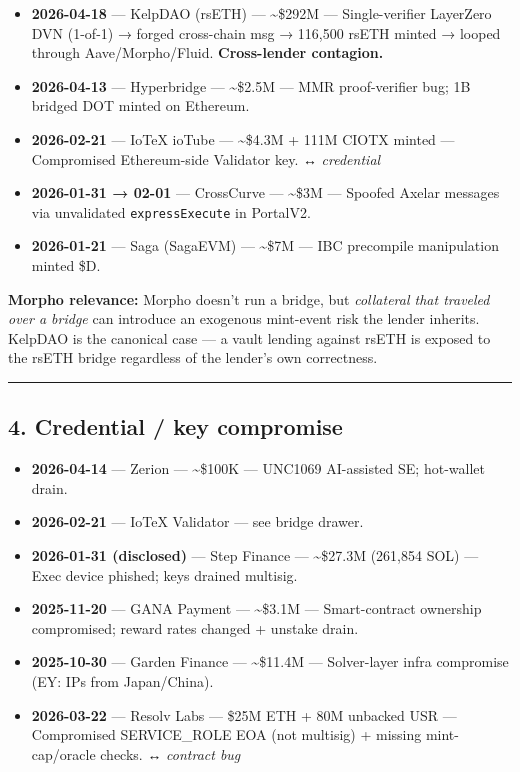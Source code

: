 \begin{itemize}
\tightlist
\item
  \textbf{2026-04-18} --- KelpDAO (rsETH) --- \textasciitilde\$292M --- Single-verifier LayerZero DVN (1-of-1) → forged cross-chain msg → 116,500 rsETH minted → looped through Aave/Morpho/Fluid. \textbf{Cross-lender contagion.}
\item
  \textbf{2026-04-13} --- Hyperbridge --- \textasciitilde\$2.5M --- MMR proof-verifier bug; 1B bridged DOT minted on Ethereum.
\item
  \textbf{2026-02-21} --- IoTeX ioTube --- \textasciitilde\$4.3M + 111M CIOTX minted --- Compromised Ethereum-side Validator key. ↔ \emph{credential}
\item
  \textbf{2026-01-31 → 02-01} --- CrossCurve --- \textasciitilde\$3M --- Spoofed Axelar messages via unvalidated \texttt{expressExecute} in PortalV2.
\item
  \textbf{2026-01-21} --- Saga (SagaEVM) --- \textasciitilde\$7M --- IBC precompile manipulation minted \$D.
\end{itemize}

\textbf{Morpho relevance:} Morpho doesn't run a bridge, but \emph{collateral that traveled over a bridge} can introduce an exogenous mint-event risk the lender inherits. KelpDAO is the canonical case --- a vault lending against rsETH is exposed to the rsETH bridge regardless of the lender's own correctness.

\begin{center}\rule{0.5\linewidth}{0.5pt}\end{center}

\subsection{4. Credential / key compromise}\label{credential-key-compromise}

\begin{itemize}
\tightlist
\item
  \textbf{2026-04-14} --- Zerion --- \textasciitilde\$100K --- UNC1069 AI-assisted SE; hot-wallet drain.
\item
  \textbf{2026-02-21} --- IoTeX Validator --- see bridge drawer.
\item
  \textbf{2026-01-31 (disclosed)} --- Step Finance --- \textasciitilde\$27.3M (261,854 SOL) --- Exec device phished; keys drained multisig.
\item
  \textbf{2025-11-20} --- GANA Payment --- \textasciitilde\$3.1M --- Smart-contract ownership compromised; reward rates changed + unstake drain.
\item
  \textbf{2025-10-30} --- Garden Finance --- \textasciitilde\$11.4M --- Solver-layer infra compromise (EY: IPs from Japan/China).
\item
  \textbf{2026-03-22} --- Resolv Labs --- \$25M ETH + 80M unbacked USR --- Compromised SERVICE\_ROLE EOA (not multisig) + missing mint-cap/oracle checks. ↔ \emph{contract bug}
\end{itemize}

